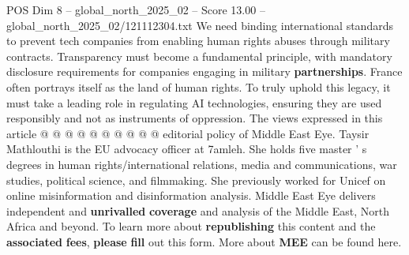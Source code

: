 \begin{textsample}{POS Dim 8 – global\_north\_2025\_02 – Score 13.00 – global\_north\_2025\_02/121112304.txt}
We need binding international standards to prevent tech companies from enabling human rights abuses through military contracts.
Transparency must become a fundamental principle, with mandatory disclosure requirements for companies engaging in military \textbf{partnerships}.
France often portrays itself as the land of human rights.
To truly uphold this legacy, it must take a leading role in regulating AI technologies, ensuring they are used responsibly and not as instruments of oppression.
The views expressed in this article @ @ @ @ @ @ @ @ @ @ editorial policy of Middle East Eye.
Taysir Mathlouthi is the EU advocacy officer at 7amleh.
She holds five master ' s degrees in human rights/international relations, media and communications, war studies, political science, and filmmaking.
She previously worked for Unicef on online misinformation and disinformation analysis.
Middle East Eye delivers independent and \textbf{unrivalled} \textbf{coverage} and analysis of the Middle East, North Africa and beyond.
To learn more about \textbf{republishing} this content and the \textbf{associated} \textbf{fees}, \textbf{please} \textbf{fill} out this form.
More about \textbf{MEE} can be found here.

\end{textsample}
